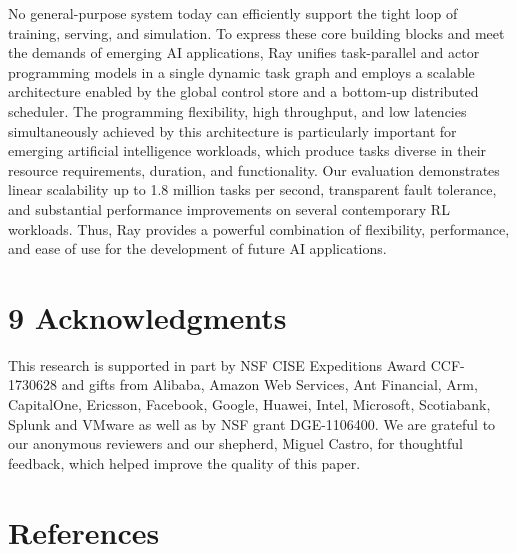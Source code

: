 \documentclass[
]{article}
\begin{document}
No general-purpose system today can efficiently support the tight loop
of training, serving, and simulation. To express these core building
blocks and meet the demands of emerging AI applications, Ray unifies
task-parallel and actor programming models in a single dynamic task
graph and employs a scalable architecture enabled by the global control
store and a bottom-up distributed scheduler. The programming
flexibility, high throughput, and low latencies simultaneously achieved
by this architecture is particularly important for emerging artificial
intelligence workloads, which produce tasks diverse in their resource
requirements, duration, and functionality. Our evaluation demonstrates
linear scalability up to 1.8 million tasks per second, transparent fault
tolerance, and substantial performance improvements on several
contemporary RL workloads. Thus, Ray provides a powerful combination of
flexibility, performance, and ease of use for the development of future
AI applications.

\section{9 Acknowledgments}\label{acknowledgments}

This research is supported in part by NSF CISE Expeditions Award
CCF-1730628 and gifts from Alibaba, Amazon Web Services, Ant Financial,
Arm, CapitalOne, Ericsson, Facebook, Google, Huawei, Intel, Microsoft,
Scotiabank, Splunk and VMware as well as by NSF grant DGE-1106400. We
are grateful to our anonymous reviewers and our shepherd, Miguel Castro,
for thoughtful feedback, which helped improve the quality of this paper.

\section{References}\label{references}
\end{document}
